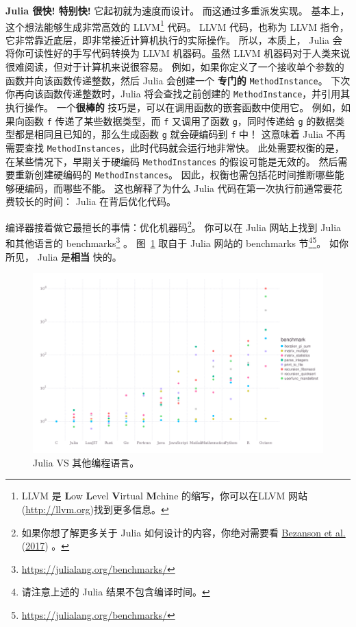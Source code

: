 \documentclass[
  notoc %
]{tufte-book}
\DeclareRobustCommand{\href}[2]{#2\footnote{\url{#1}}}
\newcommand{\passthrough}[1]{#1}
\begin{document}
\textbf{Julia 很快! 特别快!} 它起初就为速度而设计。
而这通过多重派发实现。 基本上，这个想法能够生成非常高效的
LLVM\footnote{LLVM 是 \textbf{L}ow \textbf{L}evel \textbf{V}irtual
  \textbf{M}chine 的缩写，你可以在LLVM
  网站(\url{http://llvm.org})找到更多信息。} 代码。 LLVM 代码，也称为
LLVM 指令，它非常靠近底层，即非常接近计算机执行的实际操作。
所以，本质上， Julia 会将你可读性好的手写代码转换为 LLVM 机器码。虽然
LLVM 机器码对于人类来说很难阅读，但对于计算机来说很容易。
例如，如果你定义了一个接收单个参数的函数并向该函数传递整数，然后 Julia
会创建一个 \textbf{专门的} \passthrough{\lstinline!MethodInstance!}。
下次你再向该函数传递整数时，Julia 将会查找之前创建的
\passthrough{\lstinline!MethodInstance!}，并引用其执行操作。
一个\textbf{很棒的} 技巧是，可以在调用函数的嵌套函数中使用它。
例如，如果向函数 \passthrough{\lstinline!f!} 传递了某些数据类型，而
\passthrough{\lstinline!f!} 又调用了函数
\passthrough{\lstinline!g!}，同时传递给 \passthrough{\lstinline!g!}
的数据类型都是相同且已知的，那么生成函数 \passthrough{\lstinline!g!}
就会硬编码到 \passthrough{\lstinline!f!} 中！ 这意味着 Julia
不再需要查找
\passthrough{\lstinline!MethodInstances!}，此时代码就会运行地非常快。
此处需要权衡的是，在某些情况下，早期关于硬编码
\passthrough{\lstinline!MethodInstances!} 的假设可能是无效的。
然后需要重新创建硬编码的 \passthrough{\lstinline!MethodInstances!}。
因此，权衡也需包括花时间推断哪些能够硬编码，而哪些不能。
这也解释了为什么 Julia 代码在第一次执行前通常要花费较长的时间： Julia
在背后优化代码。

编译器接着做它最擅长的事情：优化机器码\footnote{如果你想了解更多关于
  Julia 如何设计的内容，你绝对需要看
  \protect\hyperlink{ref-bezanson2017julia}{Bezanson et al.}
  (\protect\hyperlink{ref-bezanson2017julia}{2017}) 。}。 你可以在 Julia
网站上找到 Julia 和其他语言的
\href{https://julialang.org/benchmarks/}{benchmarks} 。
图~\ref{fig:benchmarks} 取自于
\href{https://julialang.org/benchmarks/}{Julia 网站的 benchmarks
节\footnote{请注意上述的 Julia 结果不包含编译时间。}}。 如你所见， Julia
是\textbf{相当} 快的。

\begin{figure}
\hypertarget{fig:benchmarks}{%
\centering
\includegraphics{images/benchmarks.png}
\caption{Julia VS 其他编程语言。}\label{fig:benchmarks}
}
\end{figure}
\end{document}
